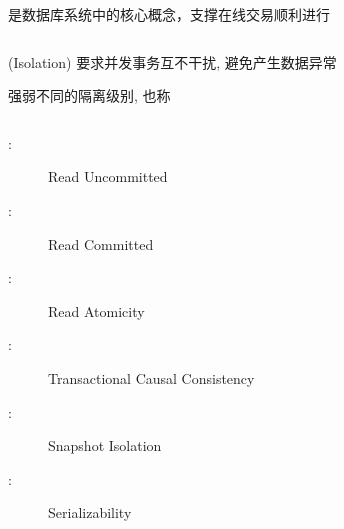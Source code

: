 
\begin{frame}{}
  \begin{center}
    是数据库系统中的核心概念，支撑在线交易顺利进行
  \end{center}

  \begin{columns}
  \end{columns}

  \vspace{0.30cm}
  \begin{center}
     (Isolation) 要求并发事务互不干扰, 避免产生数据异常
  \end{center}
\end{frame}

\begin{frame}{}
  \begin{center}
    强弱不同的隔离级别, 也称

    \vspace{0.30cm}

    \begin{columns}
        \begin{description}
          \item[\ru:] Read Uncommitted
          \item[\rc:] Read Committed
          \item[\ra:] Read Atomicity
          \item[\tcc:] Transactional Causal Consistency
          \item[\si:] Snapshot Isolation
          \item[\ser:] Serializability
        \end{description}
    \end{columns}
  \end{center}
\end{frame}


